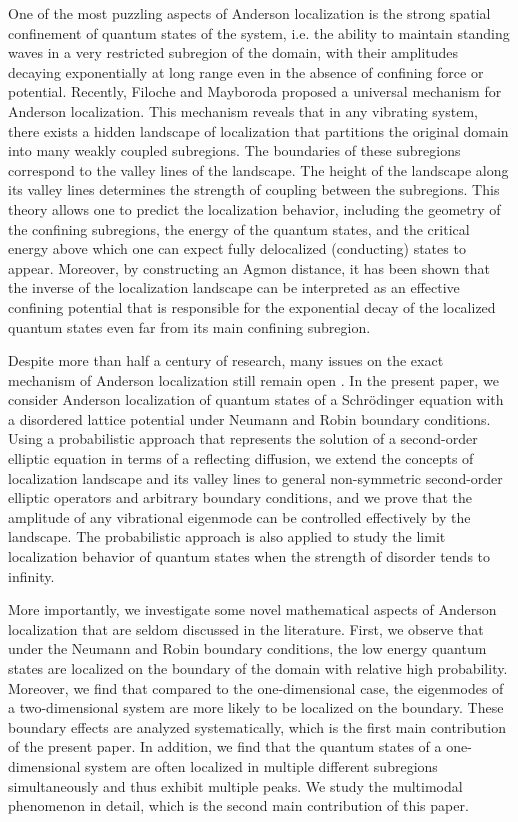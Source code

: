 \documentclass[a4paper,11pt]{article}
\begin{document}
One of the most puzzling aspects of Anderson localization is the strong spatial confinement of quantum states of the system, i.e. the ability to maintain standing waves in a very restricted subregion of the domain, with their amplitudes decaying exponentially at long range even in the absence of confining force or potential. Recently, Filoche and Mayboroda \cite{filoche2012universal} proposed a universal mechanism for Anderson localization. This mechanism reveals that in any vibrating system, there exists a hidden landscape of localization that partitions the original domain into many weakly coupled subregions. The boundaries of these subregions correspond to the valley lines of the landscape. The height of the landscape along its valley lines determines the strength of coupling between the subregions. This theory allows one to predict the localization behavior, including the geometry of the confining subregions, the energy of the quantum states, and the critical energy above which one can expect fully delocalized (conducting) states to appear. Moreover, by constructing an Agmon distance, it has been shown \cite{arnold2016effective, arnold2019localization, arnold2019computing} that the inverse of the localization landscape can be interpreted as an effective confining potential that is responsible for the exponential decay of the localized quantum states even far from its main confining subregion.

Despite more than half a century of research, many issues on the exact mechanism of Anderson localization still remain open \cite{abrahams2001metallic, evers2008anderson, lagendijk2009fifty}. In the present paper, we consider Anderson localization of quantum states of a Schr\"{o}dinger equation with a disordered lattice potential under Neumann and Robin boundary conditions. Using a probabilistic approach that represents the solution of a second-order elliptic equation in terms of a reflecting diffusion, we extend the concepts of localization landscape and its valley lines to general non-symmetric second-order elliptic operators and arbitrary boundary conditions, and we prove that the amplitude of any vibrational eigenmode can be controlled effectively by the landscape. The probabilistic approach is also applied to study the limit localization behavior of quantum states when the strength of disorder tends to infinity.

More importantly, we investigate some novel mathematical aspects of Anderson localization that are seldom discussed in the literature. First, we observe that under the Neumann and Robin boundary conditions, the low energy quantum states are localized on the boundary of the domain with relative high probability. Moreover, we find that compared to the one-dimensional case, the eigenmodes of a two-dimensional system are more likely to be localized on the boundary. These boundary effects are analyzed systematically, which is the first main contribution of the present paper. In addition, we find that the quantum states of a one-dimensional system are often localized in multiple different subregions simultaneously and thus exhibit multiple peaks. We study the multimodal phenomenon in detail, which is the second main contribution of this paper.
\end{document}
